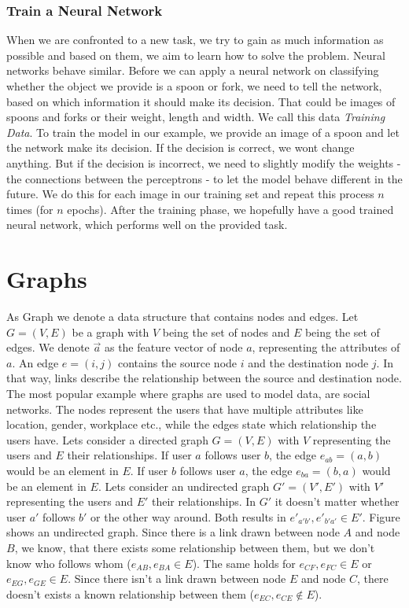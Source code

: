     \subsubsection*{Train a Neural Network}

      When we are confronted to a new task, we try to gain as much information as possible and based on them, we aim to learn how to solve the problem.
      Neural networks behave similar.
      Before we can apply a neural network on classifying whether the object we provide is a spoon or fork, we need to tell the network, based on which information it should make its decision.
      That could be images of spoons and forks or their weight, length and width.
      We call this data \emph{Training Data}.
      To train the model in our example, we provide an image of a spoon and let the network make its decision.
      If the decision is correct, we wont change anything.
      But if the decision is incorrect, we need to slightly modify the weights - the connections between the perceptrons - to let the model behave different in the future.
      We do this for each image in our training set and repeat this process $n$ times (for $n$ epochs).
      After the training phase, we hopefully have a good trained neural network, which performs well on the provided task.

	\section{Graphs}

		As Graph we denote a data structure that contains nodes and edges. 
    Let $G = (V, E)$ be a graph with $V$ being the set of nodes and $E$ being the set of edges.
    We denote $\overrightarrow{a}$ as the feature vector of node $a$, representing the attributes of $a$.
    An edge $e = (i,j)$ contains the source node $i$ and the destination node $j$.
    In that way, links describe the relationship between the source and destination node. 
    The most popular example where graphs are used to model data, are social networks. 
    The nodes represent the users that have multiple attributes like location, gender, workplace etc., while the edges state which relationship the users have.
    Lets consider a directed graph $G = (V,E)$ with $V$ representing the users and $E$ their relationships.
    If user $a$ follows user $b$, the edge $e_{ab} = (a,b)$ would be an element in $E$.
    If user $b$ follows user $a$, the edge $e_{ba} = (b,a)$ would be an element in $E$.
    Lets consider an undirected graph $G' = (V',E')$ with $V'$ representing the users and $E'$ their relationships.
    In $G'$ it doesn't matter whether user $a'$ follows $b'$ or the other way around. 
    Both results in $e'_{a'b'}, e'_{b'a'} \in E'$.
    Figure  shows an undirected graph.
    Since there is a link drawn between node $A$ and node $B$, we know, that there exists some relationship between them, but we don't know who follows whom ($e_{AB}, e_{BA} \in E$).
    The same holds for $e_{CF}, e_{FC} \in E$ or $e_{EG}, e_{GE} \in E$.
    Since there isn't a link drawn between node $E$ and node $C$, there doesn't exists a known relationship between them ($e_{EC}, e_{CE} \not\in E$).

